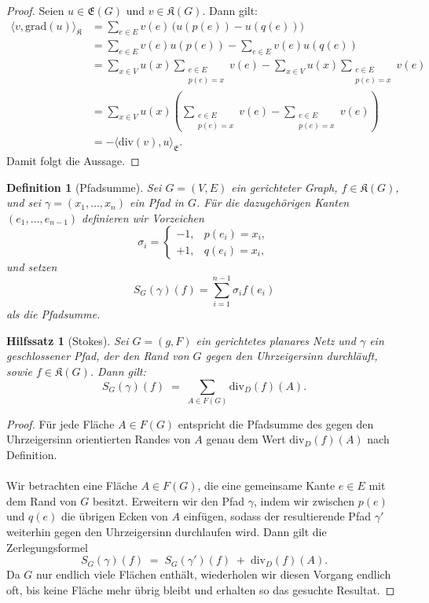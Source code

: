 \documentclass[11pt,a4paper,leqno]{report}
\newtheorem{lemma}[theorem]{Hilfssatz}
\newtheorem{definition}[theorem]{Definition}
\numberwithin{equation}{chapter}
\begin{document}
\begin{proof}
	Seien $u \in \mathfrak{E}(G)$ und $v \in \mathfrak{K}(G)$. Dann gilt:
	\begin{align*}
		\langle v, \mathrm{grad}(u)\rangle_{\mathfrak{K}}
		&= \sum_{e\in E} v(e)\,\bigl(u(p(e)) - u(q(e))\bigr) \\
		&= \sum_{e\in E} v(e) u(p(e)) - \sum_{e\in E} v(e) u(q(e))\\
		&= \sum_{x\in V} u(x) \sum_{\substack{e\in E \\ p(e)=x}}v(e) - \sum_{x\in V} u(x) \sum_{\substack{e\in E \\ p(e)=x}}v(e)\\
		&= \sum_{x\in V} u(x) \left( \sum_{\substack{e\in E \\ p(e)=x}} v(e) - \sum_{\substack{e\in E \\ p(e)=x}} v(e)\right) \\
		&= - \langle \mathrm{div}(v), u\rangle_{\mathfrak{E}}.
	\end{align*}
	Damit folgt die Aussage.
\end{proof}
\begin{definition}[Pfadsumme]
	Sei $G=(V,E)$ ein gerichteter Graph, $f \in \mathfrak{K}(G)$, und sei
	$\gamma=(x_1,\dots, x_n)$ ein Pfad in $G$. 
	Für die dazugehörigen Kanten $(e_1,\dots, e_{n-1})$ definieren wir Vorzeichen
	\[
	\sigma_i = \begin{cases}
		-1, & p(e_i)=x_i,\\
		+1, & q(e_i)=x_i,
	\end{cases}
	\]
	und setzen
	\[
	S_G(\gamma)(f)=\sum_{i=1}^{n-1}\sigma_i f(e_i)
	\]
	als die \emph{Pfadsumme}.
\end{definition}
\begin{lemma}[Stokes]
	Sei $G = (g, F)$ ein gerichtetes planares Netz und $\gamma$ ein geschlossener Pfad, der den Rand von $G$ gegen den Uhrzeigersinn durchläuft, sowie $f \in \mathfrak{K}(G)$. 
	Dann gilt:
	\begin{equation}
		S_G(\gamma)(f) \;=\; \sum_{A \in F(G)} \mathrm{div}_D(f)(A).
	\end{equation}
\end{lemma}
\begin{proof}
	Für jede Fläche $A \in F(G)$ entspricht die Pfadsumme des gegen den Uhrzeigersinn orientierten Randes von $A$ genau dem Wert $\mathrm{div}_D(f)(A)$ nach Definition.\\
	\\
	Wir betrachten eine Fläche $A \in F(G)$, die eine gemeinsame Kante $e \in E$ mit dem Rand von $G$ besitzt.
	Erweitern wir den Pfad $\gamma$, indem wir zwischen $p(e)$ und $q(e)$ die übrigen Ecken von $A$ einfügen, sodass der resultierende Pfad $\gamma'$ weiterhin gegen den Uhrzeigersinn durchlaufen wird.
	Dann gilt die Zerlegungsformel
	\[
	S_G(\gamma)(f) \;=\; S_G(\gamma')(f) \;+\; \mathrm{div}_D(f)(A).
	\]
	Da $G$ nur endlich viele Flächen enthält, wiederholen wir diesen Vorgang endlich oft, bis keine Fläche mehr übrig bleibt und erhalten so das gesuchte Resultat.
\end{proof}
\end{document}
